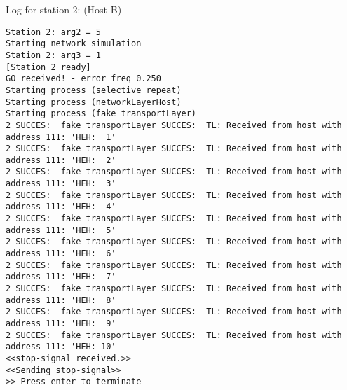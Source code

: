 Log for station 2: (Host B)
\begin{lstlisting}[breaklines=true]
Station 2: arg2 = 5
Starting network simulation
Station 2: arg3 = 1
[Station 2 ready]
GO received! - error freq 0.250
Starting process (selective_repeat)
Starting process (networkLayerHost)
Starting process (fake_transportLayer)
2 SUCCES:  fake_transportLayer SUCCES:  TL: Received from host with address 111: 'HEH:  1'
2 SUCCES:  fake_transportLayer SUCCES:  TL: Received from host with address 111: 'HEH:  2'
2 SUCCES:  fake_transportLayer SUCCES:  TL: Received from host with address 111: 'HEH:  3'
2 SUCCES:  fake_transportLayer SUCCES:  TL: Received from host with address 111: 'HEH:  4'
2 SUCCES:  fake_transportLayer SUCCES:  TL: Received from host with address 111: 'HEH:  5'
2 SUCCES:  fake_transportLayer SUCCES:  TL: Received from host with address 111: 'HEH:  6'
2 SUCCES:  fake_transportLayer SUCCES:  TL: Received from host with address 111: 'HEH:  7'
2 SUCCES:  fake_transportLayer SUCCES:  TL: Received from host with address 111: 'HEH:  8'
2 SUCCES:  fake_transportLayer SUCCES:  TL: Received from host with address 111: 'HEH:  9'
2 SUCCES:  fake_transportLayer SUCCES:  TL: Received from host with address 111: 'HEH: 10'
<<stop-signal received.>>
<<Sending stop-signal>>
>> Press enter to terminate
\end{lstlisting}

